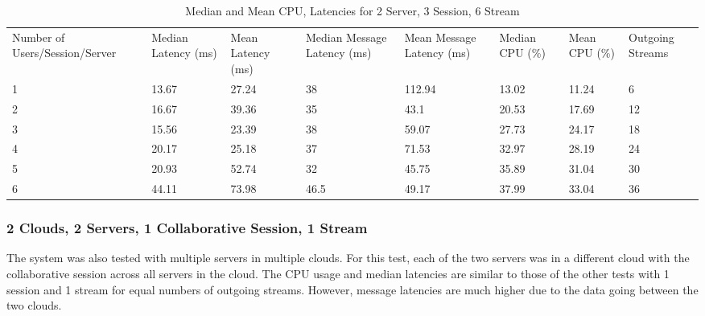 \begin{table}
\caption{Median and Mean CPU, Latencies for 2 Server, 3 Session, 6 Stream}
\label{table:2serv_3sess_6str}
\begin{tabu} to\linewidth{|X[c]|X[c]|X[c]|X[c]|X[c]|X[c]|X[c]|X[c]|}
\everyrow{\hline}
\hline
Number of Users/Session/Server & Median Latency (ms) & Mean Latency (ms) & Median Message Latency (ms) & Mean Message Latency (ms) & Median CPU (\%) & Mean CPU (\%) & Outgoing Streams\\
1 & 13.67 & 27.24 & 38 & 112.94 & 13.02 & 11.24 & 6 \\
2 & 16.67 & 39.36 & 35 & 43.1 & 20.53 & 17.69 & 12 \\
3 & 15.56 & 23.39 & 38 & 59.07 & 27.73 & 24.17 & 18 \\
4 & 20.17 & 25.18 & 37 & 71.53 & 32.97 & 28.19 & 24 \\
5 & 20.93 & 52.74 & 32 & 45.75 & 35.89 & 31.04 & 30 \\
6 & 44.11 & 73.98 & 46.5 & 49.17 & 37.99 & 33.04 & 36 \\
\end{tabu}
\end{table}

\clearpage\subsubsection{2 Clouds, 2 Servers, 1 Collaborative Session, 1 Stream}

The system was also tested with multiple servers in multiple clouds. For this test, each of the two servers was in a different cloud with the collaborative session across all servers in the cloud. The CPU usage and median latencies are similar to those of the other tests with 1 session and 1 stream for equal numbers of outgoing streams. However, message latencies are much higher due to the data going between the two clouds.


